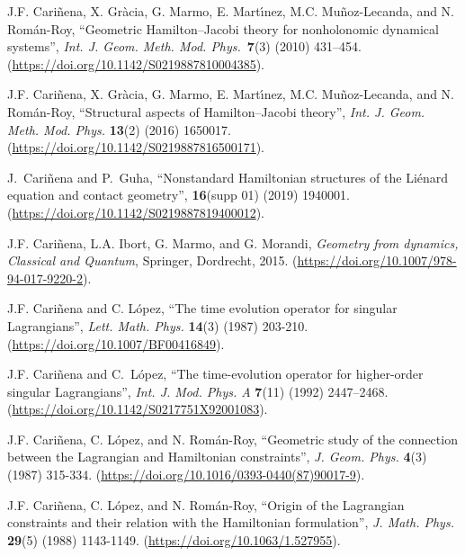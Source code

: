 \documentclass[12pt]{report}
\begin{document}
\begin{thebibliography}{999}

J.F. Cari\~nena, X. Gr\`acia, G. Marmo, E. Mart\'{\i}nez, M.C. Mu\~noz-Lecanda, 
and N. Rom\'an-Roy,
``Geometric Hamilton--Jacobi theory for nonholonomic dynamical systems'',
 {\sl Int. J. Geom. Meth. Mod. Phys.}~{\bf 7}(3) (2010) 431--454.
(\url{https://doi.org/10.1142/S0219887810004385}).

J.F. Cari\~nena, X. Gr\`acia, G. Marmo, E. Mart\'{\i}nez, M.C. Mu\~noz-Lecanda, 
and N. Rom\'an-Roy,
``Structural aspects of Hamilton--Jacobi theory'',
 {\sl Int. J. Geom. Meth. Mod. Phys.} {\bf 13}(2) (2016) 1650017.
(\url{https://doi.org/10.1142/S0219887816500171}).

J.~Cari{\~{n}}ena and P.~Guha,
\newblock ``Nonstandard Hamiltonian structures of the Li\'enard equation
and contact geometry'',
 {\bf 16}(supp 01) (2019) 1940001.
(\url{https://doi.org/10.1142/S0219887819400012}).

J.F. Cari\~nena, L.A. Ibort, G. Marmo, and G. Morandi, 
{\it Geometry from dynamics, Classical and Quantum},
Springer, Dordrecht, 2015.
(\url{https://doi.org/10.1007/978-94-017-9220-2}).

J.F. Cari\~nena and C. L\'opez, 
``The time evolution operator for singular Lagrangians'',
 {\sl Lett. Math. Phys.} {\bf 14}(3) (1987) 203-210.
(\url{https://doi.org/10.1007/BF00416849}).

J.F. {Cari\~{n}ena} and C.~{L\'{o}pez}, ``The time-evolution operator for
  higher-order singular {Lagrangians}'',
 \textsl{Int. J. Mod. Phys. A}
  \textbf{7}(11)  (1992) 2447--2468.
(\url{https://doi.org/10.1142/S0217751X92001083}).

J.F. Cari\~nena, C. L\'opez, and N. Rom\'an-Roy,
``Geometric study of the connection between the Lagrangian and
  Hamiltonian constraints'',
{\sl J. Geom. Phys.} {\bf 4}(3) (1987) 315-334.
(\url{https://doi.org/10.1016/0393-0440(87)90017-9}).

J.F. Cari\~nena, C. L\'opez, and N. Rom\'an-Roy,
``Origin of the Lagrangian constraints and their relation with the Hamiltonian formulation'',
{\sl J. Math. Phys.} {\bf 29}(5) (1988) 1143-1149.
(\url{https://doi.org/10.1063/1.527955}).


\end{thebibliography}
\end{document}
